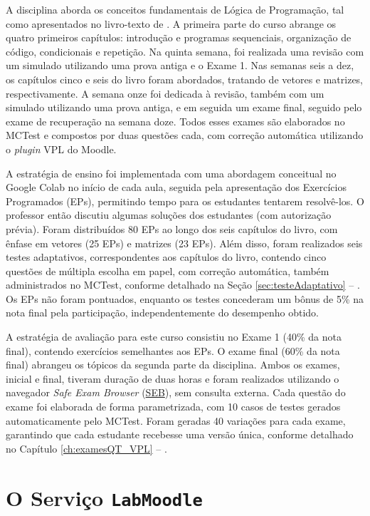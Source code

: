 A disciplina aborda os conceitos fundamentais de Lógica de Programação, tal como apresentados no livro-texto de . A primeira parte do curso abrange os quatro primeiros capítulos: introdução e programas sequenciais, organização de código, condicionais e repetição. Na quinta semana, foi realizada uma revisão com um simulado utilizando uma prova antiga e o Exame 1. Nas semanas seis a dez, os capítulos cinco e seis do livro foram abordados, tratando de vetores e matrizes, respectivamente. A semana onze foi dedicada à revisão, também com um simulado utilizando uma prova antiga, e em seguida um exame final, seguido pelo exame de recuperação na semana doze. Todos esses exames são elaborados no MCTest e compostos por duas questões cada, com correção automática utilizando o \textit{plugin} VPL do Moodle.

A estratégia de ensino foi implementada com uma abordagem conceitual no Google Colab no início de cada aula, seguida pela apresentação dos Exercícios Programados (EPs), permitindo tempo para os estudantes tentarem resolvê-los. O professor então discutiu algumas soluções dos estudantes (com autorização prévia). Foram distribuídos 80 EPs ao longo dos seis capítulos do livro, com ênfase em vetores (25 EPs) e matrizes (23 EPs). Além disso, foram realizados seis testes adaptativos, correspondentes aos capítulos do livro, contendo cinco questões de múltipla escolha em papel, com correção automática, também administrados no MCTest, conforme detalhado na Seção \ref{sec:testeAdaptativo} -- . Os EPs não foram pontuados, enquanto os testes concederam um bônus de 5\% na nota final pela participação, independentemente do desempenho obtido.

A estratégia de avaliação para este curso consistiu no Exame 1 (40\% da nota final), contendo exercícios semelhantes aos EPs. O exame final (60\% da nota final) abrangeu os tópicos da segunda parte da disciplina. Ambos os exames, inicial e final, tiveram duração de duas horas e foram realizados utilizando o navegador \textit{Safe Exam Browser} (\href{safeexambrowser.org}{SEB}), sem consulta externa. Cada questão do exame foi elaborada de forma parametrizada, com 10 casos de testes gerados automaticamente pelo MCTest. Foram geradas 40 variações para cada exame, garantindo que cada estudante recebesse uma versão única, conforme detalhado no Capítulo \ref{ch:examesQT_VPL} -- .


\section{O Serviço \texttt{LabMoodle}}

